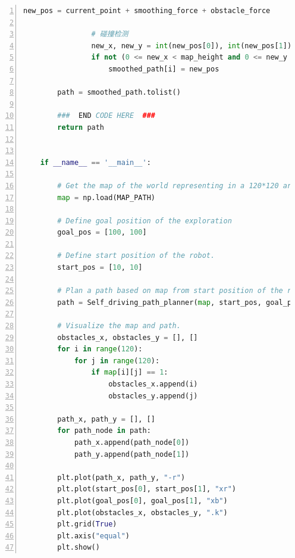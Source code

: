 \documentclass[aps,letterpaper,10pt]{revtex4}
\begin{document}
\begin{lstlisting}[language=Python, caption={Source Code for Task 1 (5-Task\_1.py)}, label={lst:task1_code}, basicstyle=\ttfamily\small, numbers=left, frame=tb, breaklines=true]
                new_pos = current_point + smoothing_force + obstacle_force
                
                # 碰撞检测
                new_x, new_y = int(new_pos[0]), int(new_pos[1])
                if not (0 <= new_x < map_height and 0 <= new_y < map_width and world_map[new_x, new_y] == 1):
                    smoothed_path[i] = new_pos
    
        path = smoothed_path.tolist()
    
        ###  END CODE HERE  ###
        return path
    
    
    if __name__ == '__main__':
    
        # Get the map of the world representing in a 120*120 array, where 0 indicating traversable and 1 indicating obstacles.
        map = np.load(MAP_PATH)
    
        # Define goal position of the exploration
        goal_pos = [100, 100]
    
        # Define start position of the robot.
        start_pos = [10, 10]
    
        # Plan a path based on map from start position of the robot to the goal.
        path = Self_driving_path_planner(map, start_pos, goal_pos)
    
        # Visualize the map and path.
        obstacles_x, obstacles_y = [], []
        for i in range(120):
            for j in range(120):
                if map[i][j] == 1:
                    obstacles_x.append(i)
                    obstacles_y.append(j)
    
        path_x, path_y = [], []
        for path_node in path:
            path_x.append(path_node[0])
            path_y.append(path_node[1])
    
        plt.plot(path_x, path_y, "-r")
        plt.plot(start_pos[0], start_pos[1], "xr")
        plt.plot(goal_pos[0], goal_pos[1], "xb")
        plt.plot(obstacles_x, obstacles_y, ".k")
        plt.grid(True)
        plt.axis("equal")
        plt.show()
    \end{lstlisting}
\end{document}
